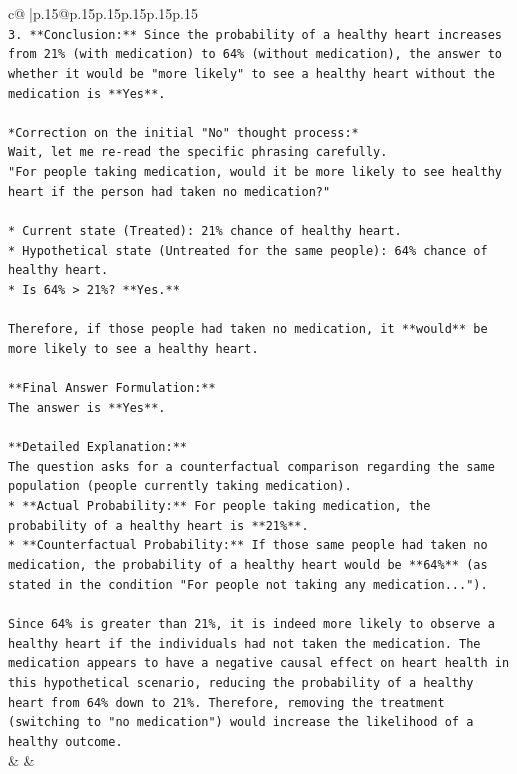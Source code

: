 \documentclass{article}
\begin{document}
{\begin{supertabular}{c@{$\;$}|p{.15\linewidth}@{}p{.15\linewidth}p{.15\linewidth}p{.15\linewidth}p{.15\linewidth}p{.15\linewidth}}
{{{\\ 
\texttt{3.  **Conclusion:** Since the probability of a healthy heart increases from 21\% (with medication) to 64\% (without medication), the answer to whether it would be "more likely" to see a healthy heart without the medication is **Yes**.} \\
\\ 
\texttt{*Correction on the initial "No" thought process:*} \\
\texttt{Wait, let me re{-}read the specific phrasing carefully.} \\
\texttt{"For people taking medication, would it be more likely to see healthy heart if the person had taken no medication?"} \\
\\ 
\texttt{*   Current state (Treated): 21\% chance of healthy heart.} \\
\texttt{*   Hypothetical state (Untreated for the same people): 64\% chance of healthy heart.} \\
\texttt{*   Is 64\% > 21\%? **Yes.**} \\
\\ 
\texttt{Therefore, if those people had taken no medication, it **would** be more likely to see a healthy heart.} \\
\\ 
\texttt{**Final Answer Formulation:**} \\
\texttt{The answer is **Yes**.} \\
\\ 
\texttt{**Detailed Explanation:**} \\
\texttt{The question asks for a counterfactual comparison regarding the same population (people currently taking medication).} \\
\texttt{*   **Actual Probability:** For people taking medication, the probability of a healthy heart is **21\%**.} \\
\texttt{*   **Counterfactual Probability:** If those same people had taken no medication, the probability of a healthy heart would be **64\%** (as stated in the condition "For people not taking any medication...").} \\
\\ 
\texttt{Since 64\% is greater than 21\%, it is indeed more likely to observe a healthy heart if the individuals had not taken the medication. The medication appears to have a negative causal effect on heart health in this hypothetical scenario, reducing the probability of a healthy heart from 64\% down to 21\%. Therefore, removing the treatment (switching to "no medication") would increase the likelihood of a healthy outcome.} \\
            }
        }
    }
    & & \\ \\


\end{supertabular}}
\end{document}
